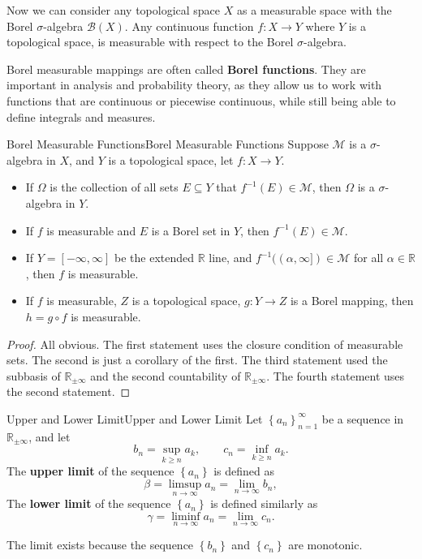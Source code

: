 \documentclass[../main.tex]{subfiles}
\begin{document}
Now we can consider any topological space $X$ as a measurable space with the Borel $\sigma$-algebra $\mathcal{B}(X)$. Any continuous function $f: X \rightarrow Y$ where $Y$ is a topological space, is measurable with respect to the Borel $\sigma$-algebra.

Borel measurable mappings are often called \textbf{Borel functions}. They are important in analysis and probability theory, as they allow us to work with functions that are continuous or piecewise continuous, while still being able to define integrals and measures.

\begin{proposition}{Borel Measurable Functions}{Borel Measurable Functions}
Suppose $\mathcal{M}$ is a $\sigma$-algebra in $X$, and $Y$ is a topological space, let $f: X \rightarrow Y$.
\begin{itemize}
	\item If $\Omega$ is the collection of all sets $E \subseteq Y$ that $f^{-1}(E)\in \mathcal{M}$, then $\Omega$ is a $\sigma$-algebra in $Y$.
	\item If $f$ is measurable and $E$ is a Borel set in $Y$, then $f^{-1}(E)\in \mathcal{M}$.
	\item If $Y = [-\infty ,\infty ]$ be the extended $\mathbb{R}$ line, and $f^{-1}((\alpha,\infty ])\in \mathcal{M}$ for all $\alpha\in \mathbb{R}$, then $f$ is measurable.
	\item If $f$ is measurable, $Z$ is a topological space, $g: Y \rightarrow Z$ is a Borel mapping, then $h=g\circ f$ is measurable.
\end{itemize}
\end{proposition}
\begin{proof}
All obvious. The first statement uses the closure condition of measurable sets. The second is just a corollary of the first. The third statement used the subbasis of $\mathbb{R}_{\pm \infty }$ and the second countability of $\mathbb{R}_{\pm \infty }$. The fourth statement uses the second statement.
\end{proof}

\begin{definition}{Upper and Lower Limit}{Upper and Lower Limit}
Let $\left\{ a_n \right\}_{n=1}^{\infty }$ be a sequence in $\mathbb{R}_{\pm \infty }$, and let
\begin{equation}
	b_n = \sup_{k\geq n} a_k, \qquad c_n = \inf_{k\geq n} a_k.
\end{equation}
The \textbf{upper limit} of the sequence $\left\{ a_n \right\}$ is defined as
\begin{equation}
	\beta = \limsup_{n\rightarrow \infty } a_n = \lim_{n\rightarrow \infty } b_n,
\end{equation}
The \textbf{lower limit} of the sequence $\left\{ a_n \right\}$ is defined similarly as
\begin{equation}
	\gamma = \liminf_{n\rightarrow \infty } a_n = \lim_{n\rightarrow \infty } c_n.
\end{equation}
\end{definition}
\begin{remark}
	The limit exists because the sequence $\left\{ b_n \right\}$ and $\left\{ c_n \right\}$ are monotonic.
\end{remark}
\end{document}
